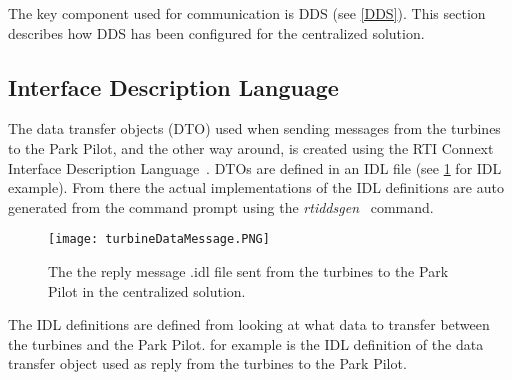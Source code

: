 The key component used for communication is DDS (see \cref{DDS}). This section describes how DDS has been configured for the centralized solution.

\subsection{Interface Description Language}

The data transfer objects (DTO) used when sending messages from the turbines to the Park Pilot, and the other way around, is created using the RTI Connext Interface Description Language~\cite{rtiConnextUsersManual}. DTOs are defined in an IDL file (see \cref{fig:cenTurbineDataMessage} for IDL example). From there the actual implementations of the IDL definitions are auto generated from the command prompt using the \textit{rtiddsgen}~\cite{rtiConnextUsersManual} command.

\begin{figure}[!h]
	\centering
	\texttt{[image: turbineDataMessage.PNG]} 
	\caption[Centralized turbine reply message]{
		\label{fig:cenTurbineDataMessage} 
		\footnotesize{%
			The the reply message .idl file sent from the turbines to the Park Pilot in the centralized solution.
		}
	}
\end{figure}

The IDL definitions are defined from looking at what data to transfer between the turbines and the Park Pilot.  for example is the IDL definition of the data transfer object used as reply from the turbines to the Park Pilot. 

%
%
%	
%

